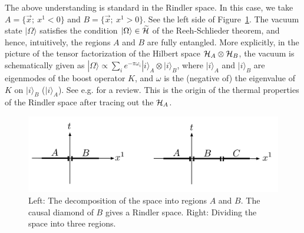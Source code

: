 \documentclass[a4paper,11pt]{article}
\theoremstyle{plain}
\theoremstyle{definition}
\numberwithin{thm}{section}
\newcommand{\ket}[1]{ | {#1} \rangle }
\def\CH{{\cal H}}
\begin{document}
The above understanding is standard in the Rindler space. In this case, we take $A=\{\vec{x}; ~ x^1<0 \}$ and
$B=\{\vec{x};~x^1>0 \}$. See the left side of Figure~\ref{fig:rindler}.
The vacuum state $\ket{\Omega}$ satisfies the condition $\ket{\Omega} \in \widetilde{\CH}$ of the Reeh-Schlieder theorem,
and hence, intuitively, the regions $A$ and $B$ are fully entangled. More explicitly, in the picture of the tensor factorization of the Hilbert space $\CH_A \otimes \CH_B$,
the vacuum is schematically given as $\ket{\Omega} \propto \sum_i e^{- \pi \omega_i} \ket{i}_A \otimes \ket{i}_B$, where $\ket{i}_A$ and $\ket{i}_B$ are eigenmodes of the boost operator $K$,
and $\omega$ is the (negative of) the eigenvalue of $K$ on $\ket{i}_B$ ($\ket{i}_A$).
See e.g. \cite{Harlow:2014yka} for a review.
This is the origin of the thermal properties of the Rindler space after tracing out the $\CH_A$.
\begin{figure}
\centering
\includegraphics[width=.8\textwidth]{rindler}
\caption{Left: The decomposition of the space into regions $A$ and $B$. The causal diamond of $B$ gives a Rindler space.
Right: Dividing the space into three regions.  \label{fig:rindler}}
\end{figure}
\end{document}
